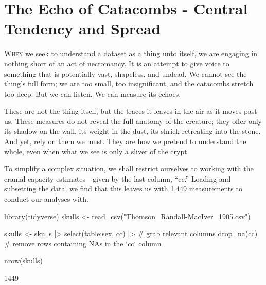 \chapter{The Echo of Catacombs - Central Tendency and Spread}

\IMFellEnglish
\lettrine[lines=5, realheight]{W}{hen} we seek to understand a dataset as a thing unto itself, we are engaging in nothing short of an act of necromancy. It is an attempt to give voice to something that is potentially vast, shapeless, and undead. We cannot see the thing's full form; we are too small, too insignificant, and the catacombs stretch too deep. But we can listen. We can measure its echoes. 

These are not the thing itself, but the traces it leaves in the air as it moves past us. These measures do not reveal the full anatomy of the creature; they offer only its shadow on the wall, its weight in the dust, its shriek retreating into the stone. And yet, rely on them we must. They are how we pretend to understand the whole, even when what we see is only a sliver of the crypt.


To simplify a complex situation, we shall restrict ourselves to working with the cranial capacity estimates—given by the last column, ``cc.'' Loading and subsetting the data, we find that this leaves us with 1,449 measurements to conduct our analyses with.

\begin{inR}
library(tidyverse)
skulls <- read_csv("Thomson_Randall-MacIver_1905.csv")

skulls <- skulls |> 
  select(table:sex, cc) |> # grab relevant columns
  drop_na(cc) # remove rows containing NAs in the `cc` column
  
nrow(skulls)
\end{inR}

\begin{outR}
[1] 1449
\end{outR}